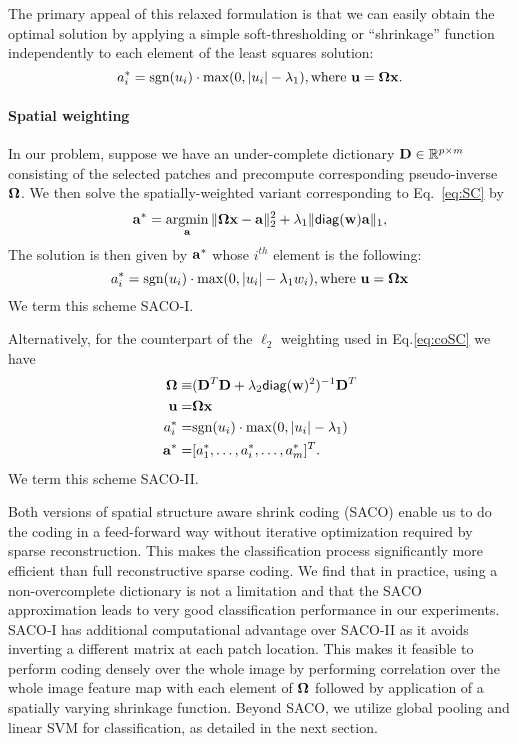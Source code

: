 \documentclass[10pt,twocolumn,letterpaper]{article}
\def\a{{\bf a}}
\def\D{{\bf D}}
\def\x{{\bf x}}
\def\u{{\bf u}}
\def\w{{\bf w}}
\def\RB{{\mathbb R}}
\def\argmin{\mathop{\rm argmin}}
\def\diag{\mathsf{diag}}
\begin{document}
The primary appeal of this relaxed formulation is that we can easily obtain the
optimal solution by applying a simple soft-thresholding or ``shrinkage''
function independently to each element of the least squares solution:
\begin{equation}
a_i^* = \text{sgn}( u_i) \cdot  \max(0, \vert u_i\vert -\lambda_1), \text{where } \u={\bf \Omega}\x.
\end{equation}

\paragraph{Spatial weighting}
In our problem, suppose we have an under-complete dictionary $\D \in
\RB^{p\times m}$ consisting of the selected patches and precompute
corresponding pseudo-inverse ${\bf \Omega}$.  We then solve the
spatially-weighted variant corresponding to Eq.~\ref{eq:SC} by
\begin{equation}
\a^*= \argmin_{\a}\Vert {\bf \Omega}\x - \a \Vert_2^2 + \lambda_1 \Vert \diag(\w) \a \Vert_1,
\end{equation}
The solution is then given by $\a^*$ whose $i^{th}$ element is the following:
\begin{equation}
a_i^* =  \text{sgn}( u_i) \cdot  \max(0, \vert u_i\vert -\lambda_1w_i), \text{where } \u={\bf \Omega}\x
\end{equation}
We term this scheme SACO-I.

Alternatively, for the counterpart of the $\ell_2$ weighting used in
Eq.\ref{eq:coSC} we have
\begin{equation}
\begin{split}
{\bf \Omega} \equiv & (\D^T \D + \lambda_2\diag(\w)^2) ^{-1}\D^T \\
\u = & {\bf \Omega}\x \\
a_i^* = & \text{sgn}( u_i ) \cdot \max(0, \vert u_i\vert -\lambda_1)\\
\a^* = &[a_1^*, \dots, a_i^*, \dots, a_m^*]^T.
\end{split}
\label{eq:variant2}
\end{equation}
We term this scheme SACO-II.


Both versions of spatial structure aware shrink coding (SACO) enable us to do
the coding in a feed-forward way without iterative optimization required by
sparse reconstruction. This makes the classification process significantly
more efficient than full reconstructive sparse coding.  We find that in
practice, using a non-overcomplete dictionary is not a limitation and that the
SACO approximation leads to very good classification performance in our
experiments.  SACO-I has additional computational advantage over SACO-II
as it avoids inverting a different matrix at each patch location. This
makes it feasible to perform coding densely over the whole image by performing
correlation over the whole image feature map with each element of ${\bf \Omega}$
followed by application of a spatially varying shrinkage function.
Beyond SACO, we utilize global pooling and linear SVM for classification,
as detailed in the next section.
\end{document}
